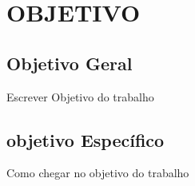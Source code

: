 \chapter{OBJETIVO}

\section{Objetivo Geral}
\par Escrever Objetivo do trabalho

\section{objetivo Específico}
\par Como chegar no objetivo do trabalho
